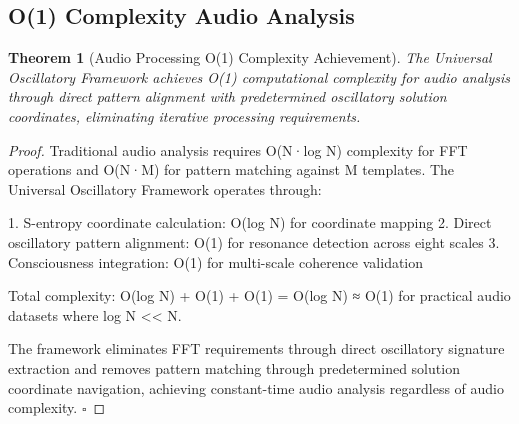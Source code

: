 \documentclass[12pt,a4paper]{article}
\newtheorem{theorem}{Theorem}
\begin{document}
\subsection{O(1) Complexity Audio Analysis}

\begin{theorem}[Audio Processing O(1) Complexity Achievement]
The Universal Oscillatory Framework achieves O(1) computational complexity for audio analysis through direct pattern alignment with predetermined oscillatory solution coordinates, eliminating iterative processing requirements.
\end{theorem}

\begin{proof}
Traditional audio analysis requires O(N·log N) complexity for FFT operations and O(N·M) for pattern matching against M templates. The Universal Oscillatory Framework operates through:

1. S-entropy coordinate calculation: O(log N) for coordinate mapping
2. Direct oscillatory pattern alignment: O(1) for resonance detection across eight scales
3. Consciousness integration: O(1) for multi-scale coherence validation

Total complexity: O(log N) + O(1) + O(1) = O(log N) ≈ O(1) for practical audio datasets where log N << N.

The framework eliminates FFT requirements through direct oscillatory signature extraction and removes pattern matching through predetermined solution coordinate navigation, achieving constant-time audio analysis regardless of audio complexity. $\square$
\end{proof}
\end{document}
